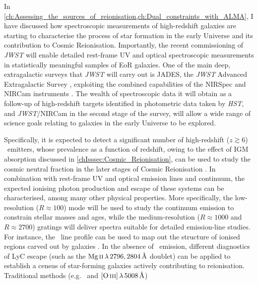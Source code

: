 In \cref{ch:Assessing_the_sources_of_reionisation,ch:Dual_constraints_with_ALMA}, I have discussed how spectroscopic measurements of high-redshift galaxies are starting to characterise the process of star formation in the early Universe and its contribution to Cosmic Reionisation. Importantly, the recent commissioning of \textit{JWST} \citep{2006SSRv..123..485G} will enable detailed rest-frame UV and optical spectroscopic measurements in statistically meaningful samples of EoR galaxies. One of the main deep, extragalactic surveys that \textit{JWST} will carry out is JADES, the \textit{JWST} Advanced Extragalactic Survey \citep[e.g.][]{2018ApJS..236...33W}, exploiting the combined capabilities of the NIRSpec and NIRCam instruments \citep{2005SPIE.5904....1R, 2012SPIE.8442E..2NB, 2022A&A...661A..80J, 2022A&A...661A..81F}. The wealth of spectroscopic data it will obtain as a follow-up of high-redshift targets identified in photometric data taken by \textit{HST}, and \textit{JWST}/NIRCam in the second stage of the survey, will allow a wide range of science goals relating to galaxies in the early Universe to be explored.

Specifically, it is expected to detect a significant number of high-redshift ($z \gtrsim 6$) \lya\ emitters, whose prevalence as a function of redshift, owing to the effect of IGM absorption discussed in \cref{chIsssec:Cosmic_Reionisation}, can be used to study the cosmic neutral fraction in the later stages of Cosmic Reionisation \citep{2010MNRAS.408.1628S, 2014ApJ...793..113P, 2014MNRAS.443.2831C, 2018ApJ...856....2M, 2019MNRAS.489.2669M, 2022MNRAS.512.5960M}. In combination with rest-frame UV and optical emission lines and continuum, the expected ionising photon production and escape of these systems can be characterised, among many other physical properties. More specifically, the low-resolution ($R \approx 100$) mode will be used to study the continuum emission to constrain stellar masses and ages, while the medium-resolution ($R \approx 1000$ and $R \approx 2700$) gratings will deliver spectra suitable for detailed emission-line studies. For instance, the \lya\ line profile can be used to map out the structure of ionised regions carved out by galaxies \citep[``ionised bubbles'';][]{2020MNRAS.499.1395M}. In the absence of \lya\ emission, different diagnostics of LyC escape (such as the $\MgII \, \lambda \, 2796, 2804 \, \Angstrom$ doublet) can be applied to establish a census of star-forming galaxies actively contributing to reionisation. Traditional methods (e.g. \Halpha\ and $\OIIIf \, \lambda \, 5008 \, \Angstrom$)

